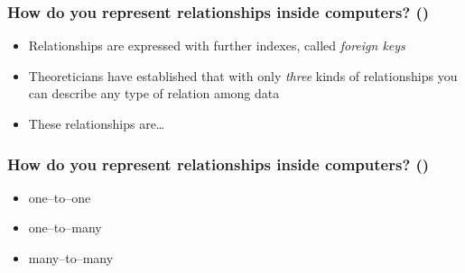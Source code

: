 \documentclass[\printmode,compress,xcolor=dvipsnames]{beamer}
\begin{document}
\begin{frame}
  \frametitle<+->{How do you represent relationships inside computers?  ()}

  \begin{itemize}[<+- | alert@+->]

    \item Relationships are expressed with further indexes, called
            \emph{foreign keys}

    \item Theoreticians have established that with only \emph{three}
            kinds of relationships you can describe any type of relation among
            data

    \item These relationships are\dots

  \end{itemize}

\end{frame}


\begin{frame}
  \frametitle<+->{How do you represent relationships inside computers?  ()}

  \begin{itemize}[<+- | alert@+->]

    \item one--to--one 

    \item one--to--many 

    \item many--to--many 

  \end{itemize}

\end{frame}

\end{document}
